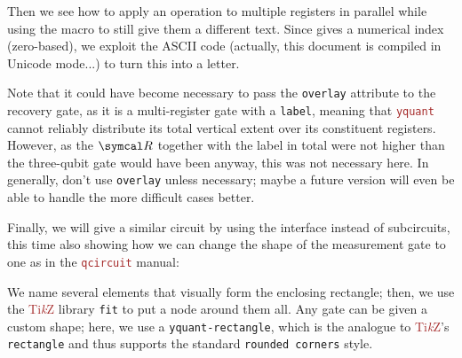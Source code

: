 \documentclass{scrartcl}
\makeatletter
\newenvironment{codeexample*}{%
   \VerbatimEnvironment%
   \let\FVB@VerbatimOut\minted@FVB@VerbatimOut
   \let\FVE@VerbatimOut\minted@FVE@VerbatimOut
   \minted@configlang{tex}%
   \minted@fvset
   \begin{VerbatimOut}[codes={\catcode`\^^I=12},firstline,lastline]{\minted@jobname.pyg}%
}{
   \end{VerbatimOut}%
   \minted@langlinenoson%
   \begin{adjustbox}{center}
       \minted@jobname.pyg %
   \end{adjustbox}\nopagebreak
   \expandafter\minted@pygmentize\expandafter{\minted@lang}%
   \minted@langlinenosoff%
   \par%
}
\def\TikZ{\textcolor{brown}{Ti\textit kZ}}
\def\pkg#1{\textcolor{brown}{\texttt{#1}}}
\def\ttlink{\link\texttt}
\def\texlink{\link\tex}
\def\Yquant{\pkg{yquant}}
\makeatother
\begin{document}
\begin{example}
               Then we see how to apply an operation to multiple registers in parallel while using the \texlink{\idx} macro to still give them a different text.
               Since \texlink{\idx} gives a numerical index (zero\hyp based), we exploit the ASCII code (actually, this document is compiled in Unicode mode...) to turn this into a letter.

               Note that it could have become necessary to pass the \ttlink{overlay} attribute to the recovery gate, as it is a multi\hyp register gate with a \texttt{label}, meaning that \Yquant{} cannot reliably distribute its total vertical extent over its constituent registers.
               However, as the $\symcal R$ together with the label in total were not higher than the three\hyp qubit gate would have been anyway, this was not necessary here.
               In generally, don't use \ttlink{overlay} unless necessary; maybe a future version will even be able to handle the more difficult cases better.

               Finally, we will give a similar circuit by using the \texlink{\enclose} interface instead of subcircuits, this time also showing how we can change the shape of the measurement gate to one as in the \pkg{qcircuit} manual:

               \begin{codeexample*}
               \end{codeexample*}
               We name several elements that visually form the enclosing rectangle; then, we use the \TikZ{} library \texttt{fit} to put a node around them all.
               Any gate can be given a custom shape; here, we use a \texttt{yquant-rectangle}, which is the analogue to \TikZ's \texttt{rectangle} and thus supports the standard \texttt{rounded corners} style.
            \end{example}
\end{document}
